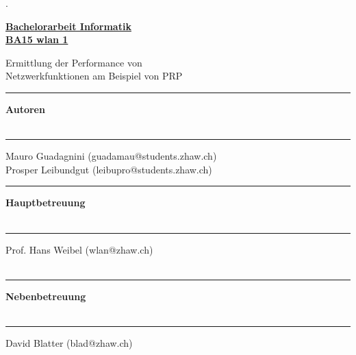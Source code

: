 \AddToShipoutPicture{\BackgroundPic}

\begin{titlepage}


\begin{minipage}[b]{0.0542\textwidth}
\hskip 0.05cm
\end{minipage}
\begin{minipage}[b]{0.91\textwidth}
\begin{tiny}.\end{tiny}\vskip 2.8cm
	{\huge
	
	\textbf{\underline{Bachelorarbeit Informatik}}\\
	\textbf{\underline{BA15 wlan 1}}
	
	Ermittlung der Performance von\\
	Netzwerkfunktionen am Beispiel von PRP	
	\vskip 0.5cm}
	
	\begin{minipage}[b]{0.27\textwidth}
	\hrule\vskip 0.5cm
		\textbf{Autoren}\\
		\\
	\end{minipage}
	\begin{minipage}[b]{0.03\textwidth}
	\hskip 0.5cm
	\end{minipage}
	\begin{minipage}[b]{0.7\textwidth}
	\hrule\vskip 0.5cm
		Mauro Guadagnini (guadamau@students.zhaw.ch)\\
		Prosper Leibundgut (leibupro@students.zhaw.ch)\\
	\end{minipage}
	
	\begin{minipage}[b]{0.27\textwidth}
	\hrule\vskip 0.5cm
		\textbf{Hauptbetreuung}\\
		\\
	\end{minipage}
	\begin{minipage}[b]{0.03\textwidth}
	\hskip 0.5cm
	\end{minipage}
	\begin{minipage}[b]{0.7\textwidth}
	\hrule\vskip 0.5cm
		Prof. Hans Weibel (wlan@zhaw.ch)\\
        \\
	\end{minipage}
	
	\begin{minipage}[b]{0.27\textwidth}
	\hrule\vskip 0.5cm
		\textbf{Nebenbetreuung}\\
		\\
	\end{minipage}
	\begin{minipage}[b]{0.03\textwidth}
	\hskip 0.5cm
	\end{minipage}
	\begin{minipage}[b]{0.7\textwidth}
	\hrule\vskip 0.5cm
		David Blatter (blad@zhaw.ch)\\
		\\
	\end{minipage}
	

\end{minipage}
\end{titlepage}
